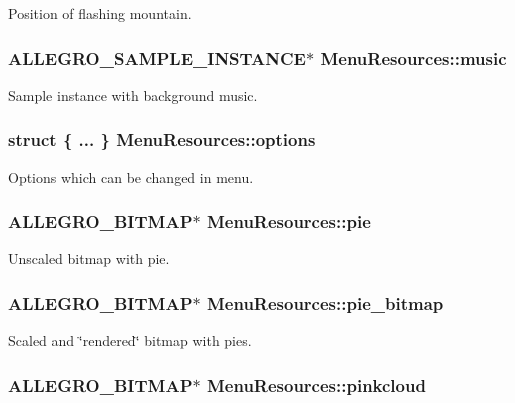Position of flashing mountain. \hypertarget{structMenuResources_a33e189b8424eb9234bb642f3ad41fbb6}{
\subsubsection[{music}]{\setlength{\rightskip}{0pt plus 5cm}A\+L\+L\+E\+G\+R\+O\+\_\+\+S\+A\+M\+P\+L\+E\+\_\+\+I\+N\+S\+T\+A\+N\+C\+E$\ast$ Menu\+Resources\+::music}}\label{structMenuResources_a33e189b8424eb9234bb642f3ad41fbb6}
Sample instance with background music. \hypertarget{structMenuResources_ac0a8a510aa2b0980f30cf2bd98bccd77}{
\subsubsection[{options}]{\setlength{\rightskip}{0pt plus 5cm}struct \{ ... \}   Menu\+Resources\+::options}}\label{structMenuResources_ac0a8a510aa2b0980f30cf2bd98bccd77}
Options which can be changed in menu. \hypertarget{structMenuResources_a4703db212d017bde65e4da5e52ab41e2}{
\subsubsection[{pie}]{\setlength{\rightskip}{0pt plus 5cm}A\+L\+L\+E\+G\+R\+O\+\_\+\+B\+I\+T\+M\+A\+P$\ast$ Menu\+Resources\+::pie}}\label{structMenuResources_a4703db212d017bde65e4da5e52ab41e2}
Unscaled bitmap with pie. \hypertarget{structMenuResources_aa2d24eaa26d281daff97c3f6acc73476}{
\subsubsection[{pie\+\_\+bitmap}]{\setlength{\rightskip}{0pt plus 5cm}A\+L\+L\+E\+G\+R\+O\+\_\+\+B\+I\+T\+M\+A\+P$\ast$ Menu\+Resources\+::pie\+\_\+bitmap}}\label{structMenuResources_aa2d24eaa26d281daff97c3f6acc73476}
Scaled and \char`\"{}rendered\char`\"{} bitmap with pies. \hypertarget{structMenuResources_a95afab6c1ada7e273bcbc4e7e895cf62}{
\subsubsection[{pinkcloud}]{\setlength{\rightskip}{0pt plus 5cm}A\+L\+L\+E\+G\+R\+O\+\_\+\+B\+I\+T\+M\+A\+P$\ast$ Menu\+Resources\+::pinkcloud}}\label{structMenuResources_a95afab6c1ada7e273bcbc4e7e895cf62}
